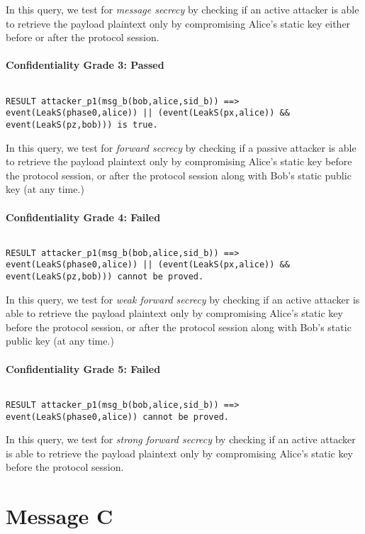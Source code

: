 In this query, we test for \emph{message secrecy} by checking if an active attacker is able to retrieve the payload plaintext only by compromising Alice's static key either before or after the protocol session.


\paragraph{Confidentiality Grade 3: Passed}$ $
\begin{lstlisting}
RESULT attacker_p1(msg_b(bob,alice,sid_b)) ==> event(LeakS(phase0,alice)) || (event(LeakS(px,alice)) && event(LeakS(pz,bob))) is true.
\end{lstlisting}

In this query, we test for \emph{forward secrecy} by checking if a passive attacker is able to retrieve the payload plaintext only by compromising Alice's static key before the protocol session, or after the protocol session along with Bob's static public key (at any time.)


\paragraph{Confidentiality Grade 4: Failed}$ $
\begin{lstlisting}
RESULT attacker_p1(msg_b(bob,alice,sid_b)) ==> event(LeakS(phase0,alice)) || (event(LeakS(px,alice)) && event(LeakS(pz,bob))) cannot be proved.
\end{lstlisting}

In this query, we test for \emph{weak forward secrecy} by checking if an active attacker is able to retrieve the payload plaintext only by compromising Alice's static key before the protocol session, or after the protocol session along with Bob's static public key (at any time.)


\paragraph{Confidentiality Grade 5: Failed}$ $
\begin{lstlisting}
RESULT attacker_p1(msg_b(bob,alice,sid_b)) ==> event(LeakS(phase0,alice)) cannot be proved.
\end{lstlisting}

In this query, we test for \emph{strong forward secrecy} by checking if an active attacker is able to retrieve the payload plaintext only by compromising Alice's static key before the protocol session.


\section{ Message C}

